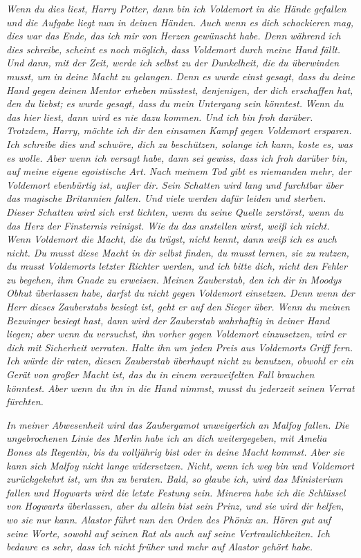 \emph{Wenn du dies liest, Harry Potter, dann bin ich Voldemort in die Hände
gefallen und die Aufgabe liegt nun in deinen Händen. Auch wenn es dich
schockieren mag, dies war das Ende, das ich mir von Herzen gewünscht habe. Denn
während ich dies schreibe, scheint es noch möglich, dass Voldemort durch meine
Hand fällt. Und dann, mit der Zeit, werde ich selbst zu der Dunkelheit, die du
überwinden musst, um in deine Macht zu gelangen. Denn es wurde einst gesagt,
dass du deine Hand gegen deinen Mentor erheben müsstest, denjenigen, der dich
erschaffen hat, den du liebst; es wurde gesagt, dass du mein Untergang sein
könntest.} \emph{ Wenn du das hier liest, dann wird es nie dazu kommen. Und ich
bin froh darüber. Trotzdem, Harry, möchte ich dir den einsamen Kampf gegen
Voldemort ersparen. Ich schreibe dies und schwöre, dich zu beschützen, solange
ich kann, koste es, was es wolle. Aber wenn ich versagt habe, dann sei gewiss,
dass ich froh darüber bin, auf meine eigene egoistische Art.} \emph{ Nach meinem
Tod gibt es niemanden mehr, der Voldemort ebenbürtig ist, außer dir. Sein
Schatten wird lang und furchtbar über das magische Britannien fallen. Und viele
werden dafür leiden und sterben. Dieser Schatten wird sich erst lichten, wenn du
seine Quelle zerstörst, wenn du das Herz der Finsternis reinigst. Wie du das
anstellen wirst, weiß ich nicht. Wenn Voldemort die Macht, die du trägst, nicht
kennt, dann weiß ich es auch nicht. Du musst diese Macht in dir selbst finden,
du musst lernen, sie zu nutzen, du musst Voldemorts letzter Richter werden, und
ich bitte dich, nicht den Fehler zu begehen, ihm Gnade zu erweisen.} \emph{
Meinen Zauberstab, den ich dir in Moodys Obhut überlassen habe, darfst du nicht
gegen Voldemort einsetzen. Denn wenn der Herr dieses Zauberstabs besiegt ist,
geht er auf den Sieger über. Wenn du meinen Bezwinger besiegt hast, dann wird
der Zauberstab wahrhaftig in deiner Hand liegen; aber wenn du versuchst, ihn
vorher gegen Voldemort einzusetzen, wird er dich mit Sicherheit verraten. Halte
ihn um jeden Preis aus Voldemorts Griff fern. Ich würde dir raten, diesen
Zauberstab überhaupt nicht zu benutzen, obwohl er ein Gerät von großer Macht
ist, das du in einem verzweifelten Fall brauchen könntest. Aber wenn du ihn in
die Hand nimmst, musst du jederzeit seinen Verrat fürchten.}

\emph{In meiner Abwesenheit wird das Zaubergamot unweigerlich an Malfoy fallen.
Die ungebrochenen Linie des Merlin habe ich an dich weitergegeben, mit Amelia
Bones als Regentin, bis du volljährig bist oder in deine Macht kommst. Aber sie
kann sich Malfoy nicht lange widersetzen. Nicht, wenn ich weg bin und Voldemort
zurückgekehrt ist, um ihn zu beraten. Bald, so glaube ich, wird das Ministerium
fallen und Hogwarts wird die letzte Festung sein. Minerva habe ich die Schlüssel
von Hogwarts überlassen, aber du allein bist sein Prinz, und sie wird dir
helfen, wo sie nur kann.} \emph{Alastor führt nun den Orden des Phönix an. Hören
gut auf seine Worte, sowohl auf seinen Rat als auch auf seine Vertraulichkeiten.
Ich bedaure es sehr, dass ich nicht früher und mehr auf Alastor gehört habe.}

